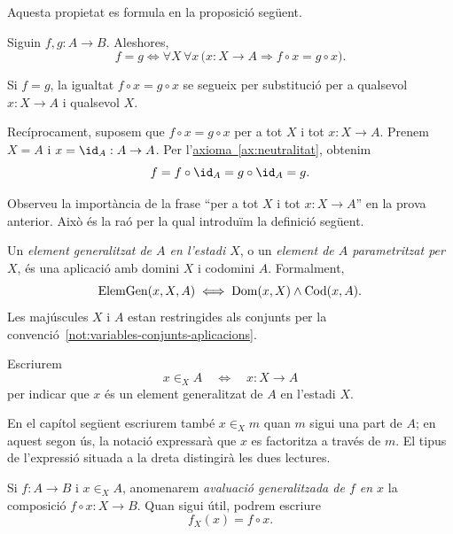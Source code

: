 Aquesta propietat es formula en la proposició següent.

\begin{proposicio}\label{prop:aplicacions-iguals}
Siguin \(f,g:A\to B\). Aleshores,
\[
f=g
\iff
\forall X \, \forall x \, \bigl( x:X \to A \Rightarrow f \circ x=g\circ x\bigr).
\]
\end{proposicio}

\begin{prova}
Si \(f=g\), la igualtat \(f\circ x=g\circ x\) se segueix per substitució per a qualsevol \(x:X\to A\) i qualsevol \(X\).

Recíprocament, suposem que \(f\circ x=g\circ x\) per a tot \(X\) i tot \(x:X\to A\). Prenem \(X=A\) i \(x=\id_A:A\to A\). Per l'\hyperref[ax:neutralitat]{axioma~\ref*{ax:neutralitat}}, obtenim
\[
f=f\circ\id_A=g\circ\id_A=g.
\]
\end{prova}

Observeu la importància de la frase \enquote{per a tot \(X\) i tot \(x:X\to A\)} en la prova anterior. Això és la raó per la qual introduïm la definició següent.

\begin{definicio}\label{def:element-generalitzat}
Un \emph{element generalitzat de \(A\) en l'estadi \(X\)}, o un \emph{element de \(A\) parametritzat per \(X\)}, és una aplicació amb domini \(X\) i codomini \(A\). Formalment,
\[
\operatorname{ElemGen}(x,X,A)
\iff
\operatorname{Dom}(x,X)\land\operatorname{Cod}(x,A).
\]
Les majúscules \(X\) i \(A\) estan restringides als conjunts per la convenció~\ref{not:variables-conjunts-aplicacions}.
\end{definicio}

\begin{notacio}\label{not:elements-generalitzats}
Escriurem
\[
x\in_X A
\quad\Longleftrightarrow\quad
x:X\to A
\]
per indicar que \(x\) és un element generalitzat de \(A\) en l'estadi \(X\).

En el capítol següent escriurem també \(x\in_X m\) quan \(m\) sigui una part de \(A\); en aquest segon ús, la notació expressarà que \(x\) es factoritza a través de \(m\). El tipus de l'expressió situada a la dreta distingirà les dues lectures.

Si \(f:A\to B\) i \(x\in_X A\), anomenarem \emph{avaluació generalitzada de \(f\) en \(x\)} la composició \(f\circ x:X\to B\). Quan sigui útil, podrem escriure
\[
f_X(x)=f\circ x.
\]
\end{notacio}

